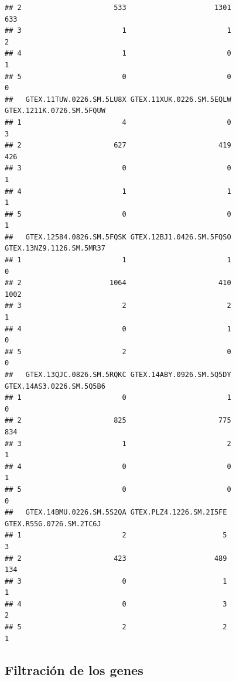 \documentclass[]{article}
\begin{document}
\begin{verbatim}
## 2                      533                     1301                      633
## 3                        1                        1                        2
## 4                        1                        0                        1
## 5                        0                        0                        0
##   GTEX.11TUW.0226.SM.5LU8X GTEX.11XUK.0226.SM.5EQLW GTEX.1211K.0726.SM.5FQUW
## 1                        4                        0                        3
## 2                      627                      419                      426
## 3                        0                        0                        1
## 4                        1                        1                        1
## 5                        0                        0                        1
##   GTEX.12584.0826.SM.5FQSK GTEX.12BJ1.0426.SM.5FQSO GTEX.13NZ9.1126.SM.5MR37
## 1                        1                        1                        0
## 2                     1064                      410                     1002
## 3                        2                        2                        1
## 4                        0                        1                        0
## 5                        2                        0                        0
##   GTEX.13QJC.0826.SM.5RQKC GTEX.14ABY.0926.SM.5Q5DY GTEX.14AS3.0226.SM.5Q5B6
## 1                        0                        1                        0
## 2                      825                      775                      834
## 3                        1                        2                        1
## 4                        0                        0                        1
## 5                        0                        0                        0
##   GTEX.14BMU.0226.SM.5S2QA GTEX.PLZ4.1226.SM.2I5FE GTEX.R55G.0726.SM.2TC6J
## 1                        2                       5                       3
## 2                      423                     489                     134
## 3                        0                       1                       1
## 4                        0                       3                       2
## 5                        2                       2                       1
\end{verbatim}

\hypertarget{filtraciuxf3n-de-los-genes}{%
\subsection{Filtración de los genes}\label{filtraciuxf3n-de-los-genes}}
\end{document}
